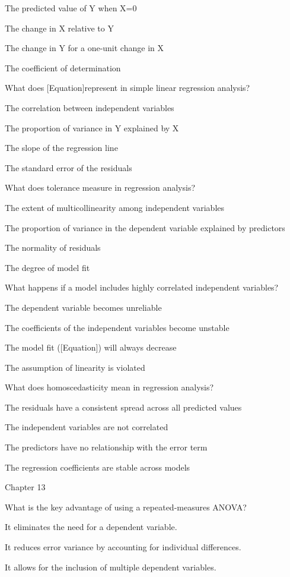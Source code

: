 \documentclass[
  letterpaper,
  DIV=11,
  numbers=noendperiod]{scrreprt}
\begin{document}
The predicted value of Y when X=0

The change in X relative to Y

The change in Y for a one-unit change in X

The coefficient of determination

What does {[}Equation{]}represent in simple linear regression analysis?

The correlation between independent variables

The proportion of variance in Y explained by X

The slope of the regression line

The standard error of the residuals

What does tolerance measure in regression analysis?

The extent of multicollinearity among independent variables

The proportion of variance in the dependent variable explained by
predictors

The normality of residuals

The degree of model fit

What happens if a model includes highly correlated independent
variables?

The dependent variable becomes unreliable

The coefficients of the independent variables become unstable

The model fit ({[}Equation{]}) will always decrease

The assumption of linearity is violated

What does homoscedasticity mean in regression analysis?

The residuals have a consistent spread across all predicted values

The independent variables are not correlated

The predictors have no relationship with the error term

The regression coefficients are stable across models

Chapter 13

What is the key advantage of using a repeated-measures ANOVA?

It eliminates the need for a dependent variable.

It reduces error variance by accounting for individual differences.

It allows for the inclusion of multiple dependent variables.
\end{document}
